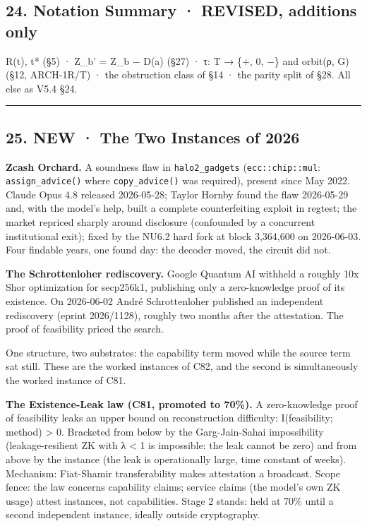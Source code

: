 \documentclass[
  11pt,
]{article}
\begin{document}
\subsection{24. Notation Summary · REVISED, additions
only}\label{notation-summary-revised-additions-only}

R(t), t* (§5) · Z\_b' = Z\_b − D(a) (§27) · τ: T → \{+, 0, −\} and
orbit(ρ, G) (§12, ARCH-1R/T) · the obstruction class of §14 · the parity
split of §28. All else as V5.4 §24.

\begin{center}\rule{0.5\linewidth}{0.5pt}\end{center}

\subsection{25. NEW · The Two Instances of
2026}\label{new-the-two-instances-of-2026}

\textbf{Zcash Orchard.} A soundness flaw in \texttt{halo2\_gadgets}
(\texttt{ecc::chip::mul}: \texttt{assign\_advice()} where
\texttt{copy\_advice()} was required), present since May 2022. Claude
Opus 4.8 released 2026-05-28; Taylor Hornby found the flaw 2026-05-29
and, with the model's help, built a complete counterfeiting exploit in
regtest; the market repriced sharply around disclosure (confounded by a
concurrent institutional exit); fixed by the NU6.2 hard fork at block
3,364,600 on 2026-06-03. Four findable years, one found day: the decoder
moved, the circuit did not.

\textbf{The Schrottenloher rediscovery.} Google Quantum AI withheld a
roughly 10x Shor optimization for secp256k1, publishing only a
zero-knowledge proof of its existence. On 2026-06-02 André
Schrottenloher published an independent rediscovery (eprint 2026/1128),
roughly two months after the attestation. The proof of feasibility
priced the search.

One structure, two substrates: the capability term moved while the
source term sat still. These are the worked instances of C82, and the
second is simultaneously the worked instance of C81.

\textbf{The Existence-Leak law (C81, promoted to 70\%).} A
zero-knowledge proof of feasibility leaks an upper bound on
reconstruction difficulty: I(feasibility; method) \textgreater{} 0.
Bracketed from below by the Garg-Jain-Sahai impossibility
(leakage-resilient ZK with λ \textless{} 1 is impossible: the leak
cannot be zero) and from above by the instance (the leak is
operationally large, time constant of weeks). Mechanism: Fiat-Shamir
transferability makes attestation a broadcast. Scope fence: the law
concerns capability claims; service claims (the model's own ZK usage)
attest instances, not capabilities. Stage 2 stands: held at 70\% until a
second independent instance, ideally outside cryptography.
\end{document}
